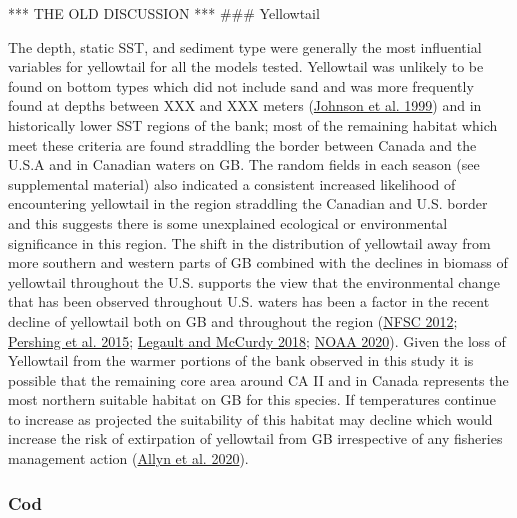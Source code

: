 \documentclass[
]{article}
\begin{document}
*** THE OLD DISCUSSION ***
\#\#\# Yellowtail

The depth, static SST, and sediment type were generally the most influential variables for yellowtail for all the models tested. Yellowtail was unlikely to be found on bottom types which did not include sand and was more frequently found at depths between XXX and XXX meters (\protect\hyperlink{ref-johnsonYellowtailFlounderLimanda1999}{Johnson et al. 1999}) and in historically lower SST regions of the bank; most of the remaining habitat which meet these criteria are found straddling the border between Canada and the U.S.A and in Canadian waters on GB. The random fields in each season (see supplemental material) also indicated a consistent increased likelihood of encountering yellowtail in the region straddling the Canadian and U.S. border and this suggests there is some unexplained ecological or environmental significance in this region. The shift in the distribution of yellowtail away from more southern and western parts of GB combined with the declines in biomass of yellowtail throughout the U.S. supports the view that the environmental change that has been observed throughout U.S. waters has been a factor in the recent decline of yellowtail both on GB and throughout the region (\protect\hyperlink{ref-nfsc54thNortheastRegional2012}{NFSC 2012}; \protect\hyperlink{ref-pershingSlowAdaptationFace2015}{Pershing et al. 2015}; \protect\hyperlink{ref-legaultStockAssessmentGeorges2018}{Legault and McCurdy 2018}; \protect\hyperlink{ref-NOAAYellowtailFlounder2020}{NOAA 2020}). Given the loss of Yellowtail from the warmer portions of the bank observed in this study it is possible that the remaining core area around CA II and in Canada represents the most northern suitable habitat on GB for this species. If temperatures continue to increase as projected the suitability of this habitat may decline which would increase the risk of extirpation of yellowtail from GB irrespective of any fisheries management action (\protect\hyperlink{ref-allynComparingSynthesizingQuantitative2020}{Allyn et al. 2020}).

\hypertarget{cod}{%
\subsubsection{Cod}\label{cod}}
\end{document}
